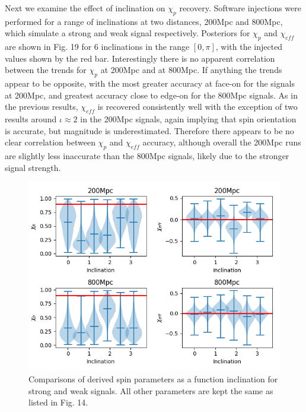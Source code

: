 \documentclass[11pt]{article}
\begin{document}
Next we examine the effect of inclination on $\chi_p$ recovery. Software injections were performed for a range of inclinations at two distances, 200Mpc and 800Mpc, which simulate a strong and weak signal respectively. Posteriors for $\chi_p$ and $\chi_{eff}$ are shown in Fig. 19 for 6 inclinations in the range $[0,\pi]$, with the injected values shown by the red bar. Interestingly there is no apparent correlation between the trends for $\chi_p$ at 200Mpc and at 800Mpc. If anything the trends appear to be opposite, with the most greater accuracy at face-on for the signals at 200Mpc, and greatest accuracy close to edge-on for the 800Mpc signals. As in the previous results, $\chi_{eff}$ is recovered consistently well with the exception of two results around $\iota\approx2$ in the 200Mpc signals, again implying that spin orientation is accurate, but magnitude is underestimated. Therefore there appears to be no clear correlation between $\chi_p$ and $\chi_{eff}$ accuracy, although overall the 200Mpc runs are slightly less inaccurate than the 800Mpc signals, likely due to the stronger signal strength.
\begin{figure}[h]
	\includegraphics[width=1\textwidth]{fig19.png}
	\centering
	\caption{Comparisons of derived spin parameters as a function inclination for strong and weak signals. All other parameters are kept the same as listed in Fig. 14.}
	\centering
\end{figure}
\end{document}
